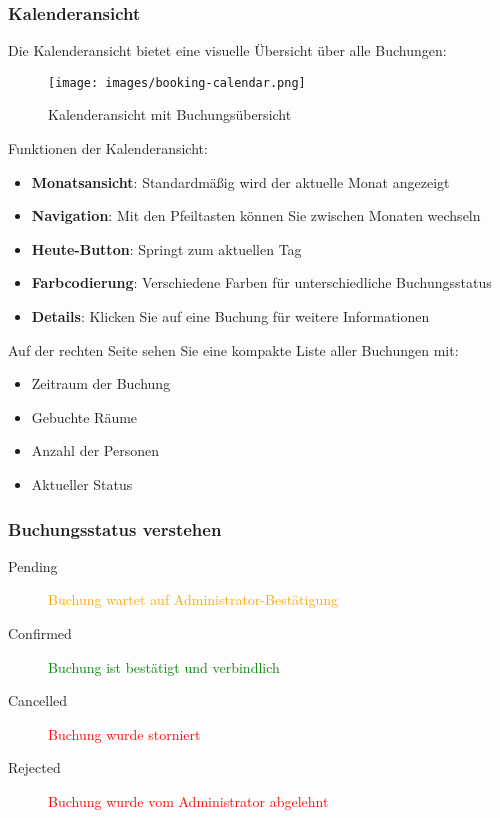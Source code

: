 \subsubsection{Kalenderansicht}

Die Kalenderansicht bietet eine visuelle Übersicht über alle Buchungen:

\begin{figure}[H]
    \centering
    \texttt{[image: images/booking-calendar.png]}
    \caption{Kalenderansicht mit Buchungsübersicht}
    \label{fig:booking-calendar}
\end{figure}

Funktionen der Kalenderansicht:
\begin{itemize}
    \item \textbf{Monatsansicht}: Standardmäßig wird der aktuelle Monat angezeigt
    \item \textbf{Navigation}: Mit den Pfeiltasten können Sie zwischen Monaten wechseln
    \item \textbf{Heute-Button}: Springt zum aktuellen Tag
    \item \textbf{Farbcodierung}: Verschiedene Farben für unterschiedliche Buchungsstatus
    \item \textbf{Details}: Klicken Sie auf eine Buchung für weitere Informationen
\end{itemize}

Auf der rechten Seite sehen Sie eine kompakte Liste aller Buchungen mit:
\begin{itemize}
    \item Zeitraum der Buchung
    \item Gebuchte Räume
    \item Anzahl der Personen
    \item Aktueller Status
\end{itemize}

\subsubsection{Buchungsstatus verstehen}

\begin{description}
    \item[Pending] \textcolor{orange}{Buchung wartet auf Administrator-Bestätigung}
    \item[Confirmed] \textcolor{green}{Buchung ist bestätigt und verbindlich}
    \item[Cancelled] \textcolor{red}{Buchung wurde storniert}
    \item[Rejected] \textcolor{red}{Buchung wurde vom Administrator abgelehnt}
\end{description}

